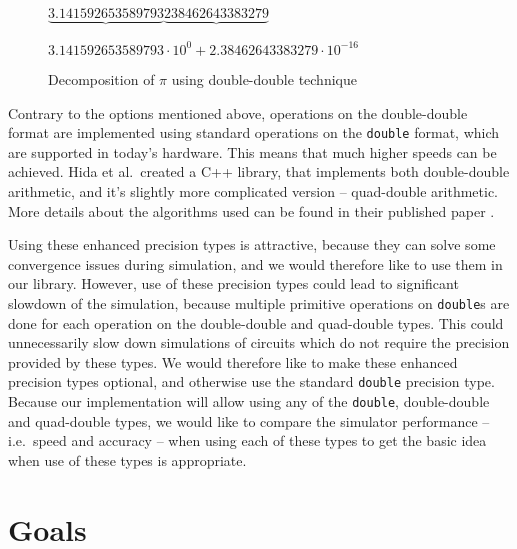 \begin{figure}[h]
	\centering	
$\underbrace{3.141592653589793}_{ }\underbrace{238462643383279}$ 

$3.141592653589793 \cdot 10^{0} + 2.38462643383279 \cdot 10^{-16}$

	\caption{Decomposition of $\pi{}$ using double-double technique}
	\label{fig:dd_pi}
\end{figure}

Contrary to the options mentioned above, operations on the double-double format are implemented using standard operations on the \texttt{double} format, which are supported in today's hardware. This means that much higher speeds can be achieved. Hida et al.\ created a C++ library, that implements both double-double arithmetic, and it's slightly more complicated version -- quad-double arithmetic. More details about the algorithms used can be found in their published paper \cite{Hida2007}. 

Using these enhanced precision types is attractive, because they can solve some convergence issues during simulation, and we would therefore like to use them in our library. However, use of these precision types could lead to significant slowdown of the simulation, because multiple primitive operations on \texttt{double}s are done for each operation on the double-double and quad-double types. This could unnecessarily slow down simulations of circuits which do not require the precision provided by these types. We would therefore like to make these enhanced precision types optional, and otherwise use the standard \texttt{double} precision type. Because our implementation will allow using any of the \texttt{double}, double-double and quad-double types, we would like to compare the simulator performance -- i.e.\ speed and accuracy -- when using each of these types to get the basic idea when use of these types is appropriate.

\section{Goals}
\label{chap:intro:goals}

